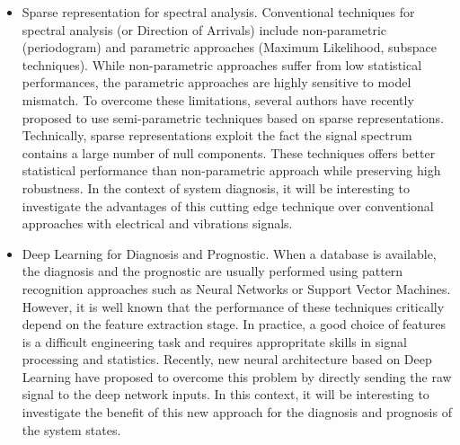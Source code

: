 \documentclass{article}
\begin{document}
\begin{itemize}
\item Sparse representation for spectral analysis. Conventional techniques for spectral analysis (or Direction of Arrivals) include non-parametric (periodogram) and parametric approaches (Maximum Likelihood, subspace techniques). While non-parametric approaches suffer from low statistical performances, the parametric approaches are highly sensitive to model mismatch. To overcome these limitations, several authors have recently proposed to use semi-parametric techniques based on sparse representations. Technically, sparse representations exploit the fact the signal spectrum contains a large number of null components. These techniques offers better statistical performance than non-parametric approach while preserving high robustness. In the context of system diagnosis, it will be interesting to investigate the advantages of this cutting edge technique over conventional approaches with electrical and vibrations signals. 

\item Deep Learning for Diagnosis and Prognostic. When a database is available, the diagnosis and the prognostic are usually performed using pattern recognition approaches such as Neural Networks or Support Vector Machines. However, it is well known that the performance of these techniques critically depend on the feature extraction stage. In practice, a good choice of features is a difficult engineering task and requires appropritate skills in signal processing and statistics. Recently, new neural architecture based on Deep Learning have proposed to overcome this problem by directly sending the raw signal to the deep network inputs. In this context, it will be interesting to investigate the benefit of this new approach for the diagnosis and prognosis of the system states.
\end{itemize}



   
\end{document}
